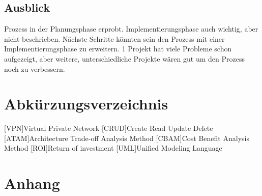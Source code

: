 \documentclass[Master,MSE,german]{twbook}
\newcommand{\listofcode}{\phantomsection\lstlistoflistings}
\begin{document}
\section{Ausblick}
Prozess in der Planungsphase erprobt. Implementierungsphase auch wichtig, aber nicht beschrieben. Nächste Schritte könnten sein den Prozess mit einer Implementierungsphase zu erweitern. 1 Projekt hat viele Probleme schon aufgezeigt, aber weitere, unterschiedliche Projekte wären gut um den Prozess noch zu verbessern.

\clearpage


\clearpage

\listoffigures
\clearpage

\listoftables
\clearpage

\listofcode
\clearpage

{}
\chapter*{Abkürzungsverzeichnis}
\begin{acronym}[XXXXX]
    [VPN]{Virtual Private Network}
    [CRUD]{Create Read Update Delete}
    [ATAM]{Architecture Trade-off Analysis Method}
    [CBAM]{Cost Benefit Analysis Method}
    [ROI]{Return of investment}
    [UML]{Unified Modeling Language}
\end{acronym}
\clearpage

{}
\chapter*{Anhang}
\end{document}
